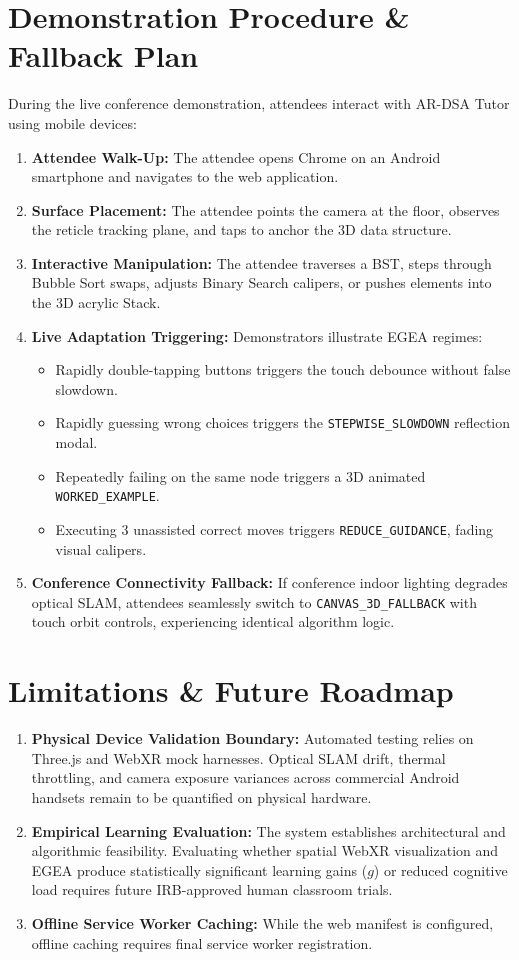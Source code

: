\documentclass[conference]{IEEEtran}
\begin{document}
\section{Demonstration Procedure \& Fallback Plan}
During the live conference demonstration, attendees interact with AR-DSA Tutor using mobile devices:
\begin{enumerate}
    \item \textbf{Attendee Walk-Up:} The attendee opens Chrome on an Android smartphone and navigates to the web application.
    \item \textbf{Surface Placement:} The attendee points the camera at the floor, observes the reticle tracking plane, and taps to anchor the 3D data structure.
    \item \textbf{Interactive Manipulation:} The attendee traverses a BST, steps through Bubble Sort swaps, adjusts Binary Search calipers, or pushes elements into the 3D acrylic Stack.
    \item \textbf{Live Adaptation Triggering:} Demonstrators illustrate EGEA regimes:
    \begin{itemize}
        \item Rapidly double-tapping buttons triggers the touch debounce without false slowdown.
        \item Rapidly guessing wrong choices triggers the \texttt{STEPWISE\_SLOWDOWN} reflection modal.
        \item Repeatedly failing on the same node triggers a 3D animated \texttt{WORKED\_EXAMPLE}.
        \item Executing 3 unassisted correct moves triggers \texttt{REDUCE\_GUIDANCE}, fading visual calipers.
    \end{itemize}
    \item \textbf{Conference Connectivity Fallback:} If conference indoor lighting degrades optical SLAM, attendees seamlessly switch to \texttt{CANVAS\_3D\_FALLBACK} with touch orbit controls, experiencing identical algorithm logic.
\end{enumerate}

\section{Limitations \& Future Roadmap}
\begin{enumerate}
    \item \textbf{Physical Device Validation Boundary:} Automated testing relies on Three.js and WebXR mock harnesses. Optical SLAM drift, thermal throttling, and camera exposure variances across commercial Android handsets remain to be quantified on physical hardware.
    \item \textbf{Empirical Learning Evaluation:} The system establishes architectural and algorithmic feasibility. Evaluating whether spatial WebXR visualization and EGEA produce statistically significant learning gains ($g$) or reduced cognitive load requires future IRB-approved human classroom trials.
    \item \textbf{Offline Service Worker Caching:} While the web manifest is configured, offline caching requires final service worker registration.
\end{enumerate}
\end{document}
